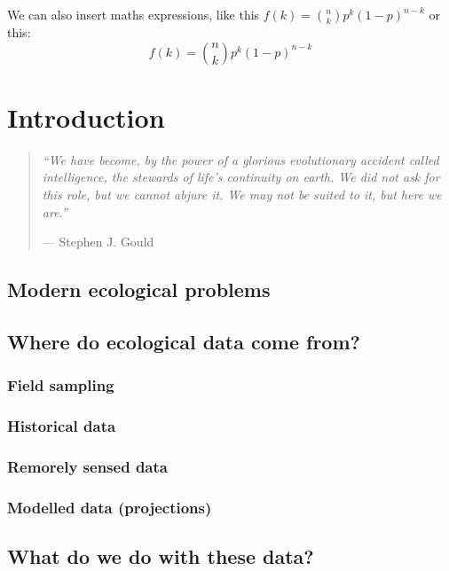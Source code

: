 \documentclass[english,10pt,a4paper,oneside]{book}
\theoremstyle{definition}
\theoremstyle{definition}
\theoremstyle{definition}
\theoremstyle{remark}
\begin{document}
We can also insert maths expressions, like this
\(f(k) = {n \choose k} p^{k} (1-p)^{n-k}\) or this:
\[f(k) = {n \choose k} p^{k} (1-p)^{n-k}\]

\chapter{Introduction}\label{intro}

\begin{quote}
\emph{\enquote{We have become, by the power of a glorious evolutionary
accident called intelligence, the stewards of life's continuity on
earth. We did not ask for this role, but we cannot abjure it. We may not
be suited to it, but here we are.}}

--- Stephen J. Gould
\end{quote}

\section{Modern ecological problems}\label{modern-ecological-problems}

\section{Where do ecological data come
from?}\label{where-do-ecological-data-come-from}

\subsection{Field sampling}\label{field-sampling}

\subsection{Historical data}\label{historical-data}

\subsection{Remorely sensed data}\label{remorely-sensed-data}

\subsection{Modelled data
(projections)}\label{modelled-data-projections}

\section{What do we do with these
data?}\label{what-do-we-do-with-these-data}
\end{document}
